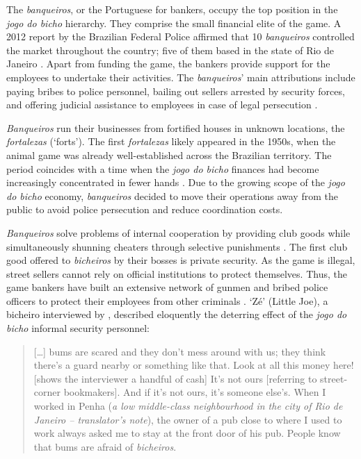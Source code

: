 \documentclass[a4paper,12pt]{article}
\begin{document}
The \textit{banqueiros}, or the Portuguese for bankers, occupy the top position in the \textit{jogo do bicho} hierarchy. They comprise the small financial elite of the game. A 2012 report by the Brazilian Federal Police affirmed that 10 \textit{banqueiros} controlled the market throughout the country; five of them based in the state of Rio de Janeiro \citep{globo2012contraventores}. Apart from funding the game, the bankers provide support for the employees to undertake their activities. The \textit{banqueiros}' main attributions include paying bribes to police personnel, bailing out sellers arrested by security forces, and offering judicial assistance to employees in case of legal persecution \citep[75]{labronici2012paratodos}.

\textit{Banqueiros} run their businesses from fortified houses in unknown locations, the \textit{fortalezas} (`forts'). The first \textit{fortalezas} likely appeared in the 1950s, when the animal game was already well-established across the Brazilian territory. The period coincides with a time when the \textit{jogo do bicho} finances had become increasingly concentrated in fewer hands \citep[259]{chazkel2011laws}. Due to the growing scope of the \textit{jogo do bicho} economy, \textit{banqueiros} decided to move their operations away from the public to avoid police persecution and reduce coordination costs.

\textit{Banqueiros} solve problems of internal cooperation by providing club goods \citep{buchanan1965economic} while simultaneously shunning cheaters through selective punishments \citep{bo2005cooperation, roth1978equilibrium}. The first club good offered to \textit{bicheiros} by their bosses is private security. As the game is illegal, street sellers cannot rely on official institutions to protect themselves. Thus, the game bankers have built an extensive network of gunmen and bribed police officers to protect their employees from other criminals \citetext{\citealp[48]{chinelli1993vazio}; \citealp[51]{labronici2012paratodos}}. `Zé' (Little Joe), a bicheiro interviewed by \citet[52]{labronici2012paratodos}, described eloquently the deterring effect of the \emph{jogo do bicho} informal security personnel:

\begin{quote}
 [\dots] bums are scared and they don't mess around with us; they think there's a guard nearby or something like that. Look at all this money here! [shows the interviewer a handful of cash] It's not ours [referring to street-corner bookmakers]. And if it's not ours, it's someone else's. When I worked in Penha (\emph{a low middle-class neighbourhood in the city of Rio de Janeiro -- translator's note}), the owner of a pub close to where I used to work always asked me to stay at the front door of his pub. People know that bums are afraid of \emph{bicheiros}.
\end{quote}
\end{document}
